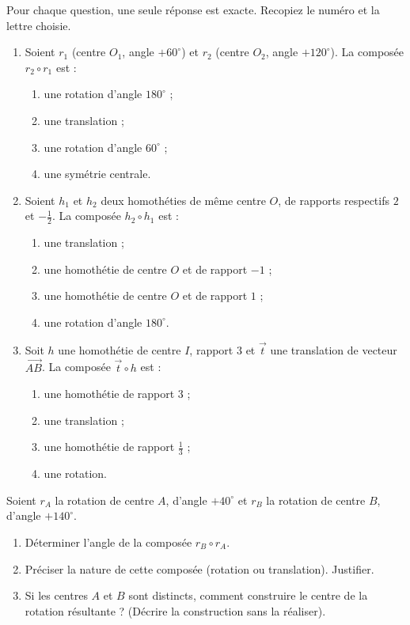 \documentclass[11pt]{article}
\begin{document}
\begin{exercice}
Pour chaque question, une seule réponse est exacte. Recopiez le numéro et la lettre choisie.
\begin{enumerate}
    \item Soient $r_1$ (centre $O_1$, angle $+60^\circ$) et $r_2$ (centre $O_2$, angle $+120^\circ$). La composée $r_2 \circ r_1$ est :
    \begin{enumerate}
        \item une rotation d'angle $180^\circ$ ;
        \item une translation ;
        \item une rotation d'angle $60^\circ$ ;
        \item une symétrie centrale.
    \end{enumerate}
    \item Soient $h_1$ et $h_2$ deux homothéties de même centre $O$, de rapports respectifs $2$ et $-\frac{1}{2}$. La composée $h_2 \circ h_1$ est :
    \begin{enumerate}
        \item une translation ;
        \item une homothétie de centre $O$ et de rapport $-1$ ;
        \item une homothétie de centre $O$ et de rapport $1$ ;
        \item une rotation d'angle $180^\circ$.
    \end{enumerate}
    \item Soit $h$ une homothétie de centre $I$, rapport $3$ et $\vec{t}$ une translation de vecteur $\overrightarrow{AB}$. La composée $\vec{t} \circ h$ est :
    \begin{enumerate}
        \item une homothétie de rapport $3$ ;
        \item une translation ;
        \item une homothétie de rapport $\frac{1}{3}$ ;
        \item une rotation.
    \end{enumerate}
\end{enumerate}
\end{exercice}

\begin{exercice}
Soient $r_A$ la rotation de centre $A$, d'angle $+40^\circ$ et $r_B$ la rotation de centre $B$, d'angle $+140^\circ$.
\begin{enumerate}
    \item Déterminer l'angle de la composée $r_B \circ r_A$.
    \item Préciser la nature de cette composée (rotation ou translation). Justifier.
    \item Si les centres $A$ et $B$ sont distincts, comment construire le centre de la rotation résultante ? (Décrire la construction sans la réaliser).
\end{enumerate}
\end{exercice}
\end{document}
